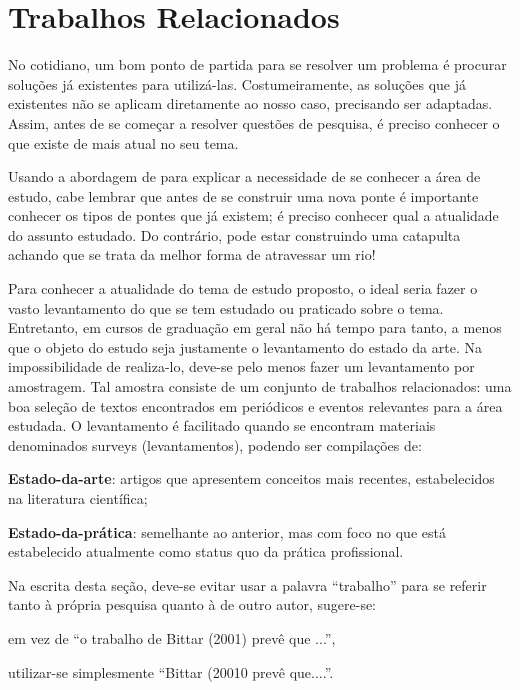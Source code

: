 \chapter{Trabalhos Relacionados}

No cotidiano, um bom ponto de partida para se resolver um problema é procurar soluções já existentes para utilizá-las. Costumeiramente, as soluções que já existentes não se aplicam diretamente ao nosso caso, precisando ser adaptadas. Assim, antes de se começar a resolver questões de pesquisa, é preciso conhecer o que existe de mais atual no seu tema. 

Usando a abordagem de  para explicar a necessidade de se conhecer a área de estudo, cabe lembrar que antes de se construir uma nova ponte é importante conhecer os tipos de pontes que já existem; é preciso conhecer qual a atualidade do assunto estudado. Do contrário, pode estar construindo uma catapulta achando que se trata da melhor forma de atravessar um rio!

Para conhecer a atualidade do tema de estudo proposto, o ideal seria fazer o vasto levantamento do que se tem estudado ou praticado sobre o tema. Entretanto, em cursos de graduação em geral não há tempo para tanto, a menos que o objeto do estudo seja justamente o levantamento do estado da arte. 
Na impossibilidade de realiza-lo, deve-se pelo menos fazer um levantamento por amostragem. Tal amostra consiste de um conjunto de trabalhos relacionados: uma boa seleção de textos encontrados em periódicos e eventos relevantes para a área estudada.  O levantamento é facilitado quando se encontram materiais denominados surveys (levantamentos), podendo ser compilações de:

\begin{alineascomponto}
    \item \textbf{Estado-da-arte}: artigos que apresentem conceitos mais recentes, estabelecidos na literatura científica;
    \item \textbf{Estado-da-prática}: semelhante ao anterior, mas com foco no que está estabelecido atualmente como status quo da prática profissional.
\end{alineascomponto}

Na escrita desta seção, deve-se evitar usar a palavra “trabalho” para se referir tanto à própria pesquisa quanto à de outro autor, sugere-se:

\begin{alineascomponto}
\item em vez de “o trabalho de Bittar (2001) prevê que ...”,
\item utilizar-se simplesmente “Bittar (20010 prevê que....”.
\end{alineascomponto}

